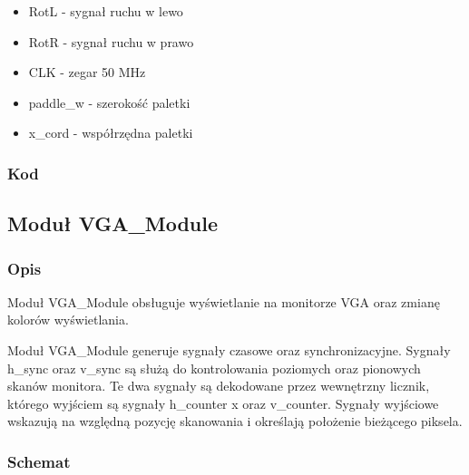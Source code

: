 \documentclass[12pt,a4paper]{article}
\begin{document}
  
\begin{itemize}
    \item RotL - sygnał ruchu w lewo
    \item RotR - sygnał ruchu w prawo
    \item CLK - zegar 50 MHz
    \item paddle\_w - szerokość paletki
     \item x\_cord - współrzędna paletki
\end{itemize}

\subsubsection{Kod}
\lstset{style=vhdl}

  
\newpage
\subsection{Moduł VGA\_Module}
\subsubsection{Opis}
Moduł VGA\_Module obsługuje wyświetlanie na monitorze VGA oraz zmianę kolorów wyświetlania.

Moduł VGA\_Module generuje sygnały czasowe oraz synchronizacyjne. Sygnały h\_sync oraz v\_sync są służą do kontrolowania poziomych oraz pionowych skanów monitora. Te dwa sygnały są dekodowane przez wewnętrzny licznik, którego wyjściem są sygnały
h\_counter x oraz v\_counter. Sygnały wyjściowe wskazują na względną pozycję skanowania i określają położenie bieżącego piksela.

\subsubsection{Schemat}

\lstset{style=vhdl}

\end{document}
